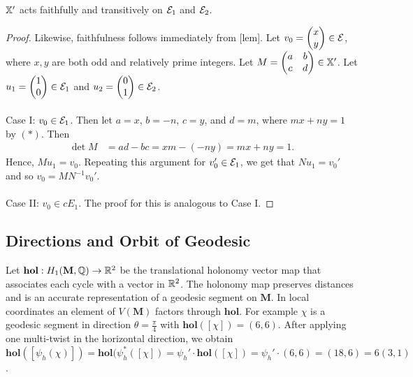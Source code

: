 \documentclass[]{article}
\def\hol{\mathbf{hol}}
\def\bM{\mathbf{M}}
\begin{document}
\begin{lem}
$\mathbb{X}'$ acts faithfully and transitively on $\mathcal{E}_1$ and $\mathcal{E}_2$.
\begin{proof}
Likewise, faithfulness follows immediately from [lem]. Let $v_0=\begin{pmatrix}x \\ y\end{pmatrix}\in\mathcal{E}$, where $x,y$ are both odd and relatively prime integers. Let $M=\begin{pmatrix}a & b \\ c & d
\end{pmatrix}\in\mathbb{X}'$. Let $u_1=\begin{pmatrix}1 \\ 0 \end{pmatrix}\in\mathcal{E}_1$ and $u_2=\begin{pmatrix}0 \\ 1 \end{pmatrix}\in\mathcal{E}_2$.\\\\
Case I: $v_0\in \mathcal{E}_1$. Then let $a=x$, $b=-n$, $c=y$, and $d=m$, where $mx+ny=1$ by $(*)$. Then
\begin{align*}
\det M &= ad-bc=xm-(-ny)=mx+ny=1.
\end{align*}
Hence, $Mu_1=v_0$. Repeating this argument for $v_0'\in \mathcal{E}_1$, we get that $Nu_1=v_0'$ and so $v_0=MN^{-1}v_0'$.\\\\
Case II: $v_0\in cE_1$. The proof for this is analogous to Case I.
\end{proof}
\end{lem}

\subsection{Directions and Orbit of Geodesic}
Let $\hol:H_1(\bM,\QQ)\rightarrow\RR^2$ be the translational holonomy vector map that associates each cycle with a vector in $\mathbb{R}^2$. The holonomy map preserves distances and is an accurate representation of a geodesic segment on $\bM$. In local coordinates an element of $V(\bM)$ factors through $\hol$. For example $\chi$ is a geodesic segment in direction $\theta=\frac{\pi}{4}$ with $\hol([\chi])=(6,6)$. After applying one multi-twist in the horizontal direction, we obtain $\hol([\psi_h(\chi)])=\hol(\psi_h^*([\chi])=\psi_h'\cdot\hol([\chi])=\psi_h'\cdot(6,6)=(18,6)=6(3,1)$. 
\end{document}
